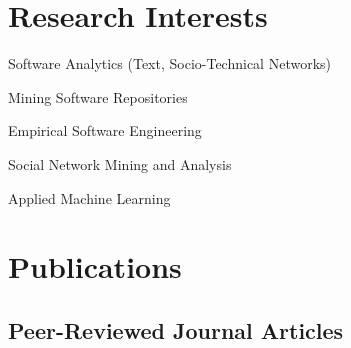 \documentclass[12pt,letterpaper]{article}
\newcommand{\listitemspace}{0.15em}
\renewenvironment{itemize}
{\begin{list}{}{\setlength{\leftmargin}{0em}
				\setlength{\parskip}{0em}
				\setlength{\itemsep}{\listitemspace}
				\setlength{\parsep}{\listitemspace}}}
{\end{list}}
\begin{document}
%
%
%			    
%
              




\section*{Research Interests}

\begin{itemize}
	
\item Software Analytics (Text, Socio-Technical Networks)
\item Mining Software Repositories
\item Empirical Software Engineering
\item Social Network Mining and Analysis
\item Applied Machine Learning


\end{itemize}



\section*{Publications}


%
\subsection*{Peer-Reviewed Journal Articles}
\end{document}
